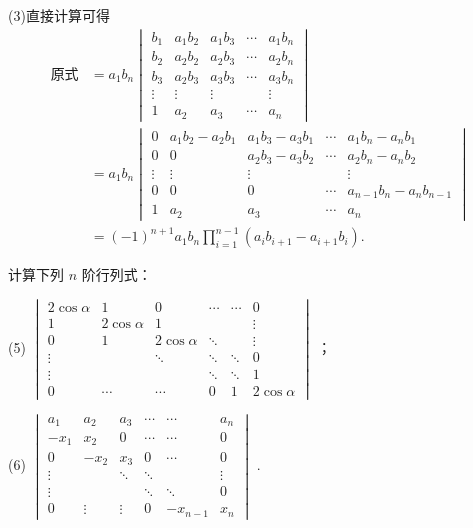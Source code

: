 \begin{sol}
	(3)直接计算可得
	\begin{align*}
		\text{原式} & =a_1b_n\begin{vmatrix}
			b_1    & a_1b_2 & a_1b_3 & \cdots & a_1b_n \\
			b_2    & a_2b_2 & a_2b_3 & \cdots & a_2b_n \\
			b_3    & a_2b_3 & a_3b_3 & \cdots & a_3b_n \\
			\vdots & \vdots & \vdots &        & \vdots \\
			1      & a_2    & a_3    & \cdots & a_n
		\end{vmatrix}                          \\
		            & =a_1b_n\begin{vmatrix}
			0      & a_1b_2-a_2b_1 & a_1b_3-a_3b_1 & \cdots & a_1b_n-a_nb_1         \\
			0      & 0             & a_2b_3-a_3b_2 & \cdots & a_2b_n-a_nb_2         \\
			\vdots & \vdots        & \vdots        &        & \vdots                \\
			0      & 0             & 0             & \cdots & a_{n-1}b_n-a_nb_{n-1} \\
			1      & a_2           & a_3           & \cdots & a_n
		\end{vmatrix}                          \\
		            & =(-1)^{n+1}a_1b_n\prod_{i=1}^{n-1}(a_ib_{i+1}-a_{i+1}b_i).
	\end{align*}
\end{sol}
\begin{prob}[26-B]
	计算下列 $n$ 阶行列式：

	(5) $\begin{vmatrix}
			2\cos\alpha & 1           & 0           & \cdots & \cdots & 0           \\
			1           & 2\cos\alpha & 1           &        &        & \vdots      \\
			0           & 1           & 2\cos\alpha & \ddots &        & \vdots      \\
			\vdots      &             & \ddots      & \ddots & \ddots & 0           \\
			\vdots      &             &             & \ddots & \ddots & 1           \\
			0           & \cdots      & \cdots      & 0      & 1      & 2\cos\alpha
		\end{vmatrix}$ ；

	(6) $\begin{vmatrix}
			a_1    & a_2    & a_3    & \cdots & \cdots   & a_n    \\
			-x_1   & x_2    & 0      & \cdots & \cdots   & 0      \\
			0      & -x_2   & x_3    & 0      & \cdots   & 0      \\
			\vdots &        & \ddots & \ddots &          & \vdots \\
			\vdots &        &        & \ddots & \ddots   & 0      \\
			0      & \vdots & \vdots & 0      & -x_{n-1} & x_n
		\end{vmatrix}$ .
\end{prob}
